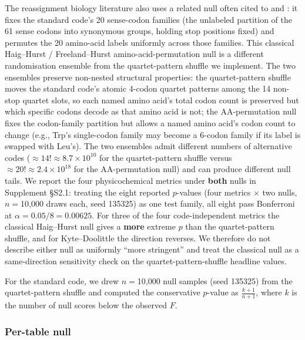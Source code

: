 \documentclass[preprint,11pt,authoryear,a4paper]{elsarticle}
\begin{document}
The reassignment biology literature also uses a related null often cited
to \citep{haig1991} and \citep{freeland1998}: it fixes the standard
code's 20 sense-codon families (the unlabeled partition of the 61 sense
codons into synonymous groups, holding stop positions fixed) and
permutes the 20 amino-acid labels uniformly across those families. This
classical Haig--Hurst / Freeland--Hurst amino-acid-permutation null is a
different randomisation ensemble from the quartet-pattern shuffle we
implement. The two ensembles preserve non-nested structural properties:
the quartet-pattern shuffle moves the standard code's atomic 4-codon
quartet patterns among the 14 non-stop quartet slots, so each named
amino acid's total codon count is preserved but which specific codons
decode as that amino acid is not; the AA-permutation null fixes the
codon-family partition but allows a named amino acid's codon count to
change (e.g., Trp's single-codon family may become a 6-codon family if
its label is swapped with Leu's). The two ensembles admit different
numbers of alternative codes (\(\approx 14! \approx 8.7 \times 10^{10}\)
for the quartet-pattern shuffle versus
\(\approx 20! \approx 2.4 \times 10^{18}\) for the AA-permutation null)
and can produce different null tails. We report the four physicochemical
metrics under \textbf{both} nulls in Supplement §S2.1: treating the
eight reported \(p\)-values (four metrics \ensuremath{\times} two nulls, \(n =\)10,000
draws each, seed 135325) as one test family, all eight pass Bonferroni
at \(\alpha = 0.05/8 = 0.00625\). For three of the four code-independent
metrics the classical Haig--Hurst null gives a \textbf{more} extreme
\(p\) than the quartet-pattern shuffle, and for Kyte--Doolittle the
direction reverses. We therefore do not describe either null as
uniformly ``more stringent'' and treat the classical null as a
same-direction sensitivity check on the quartet-pattern-shuffle headline
values.

For the standard code, we drew \(n =\)10,000 null samples (seed 135325)
from the quartet-pattern shuffle and computed the conservative
\(p\)-value as \(\frac{k + 1}{n + 1}\), where \(k\) is the number of
null scores below the observed \(F\).

\subsubsection{Per-table null}\label{sec:null-pertable}
\end{document}
